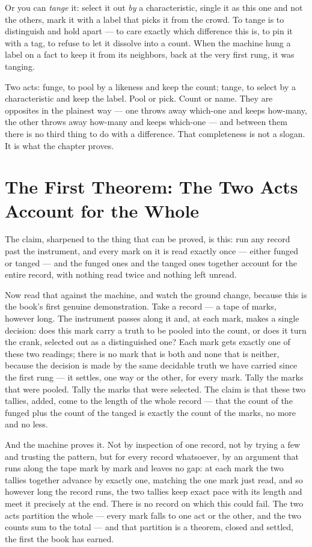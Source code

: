 Or you can \emph{tange} it: select it out \emph{by} a characteristic, single it as this one and not the others,
mark it with a label that picks it from the crowd. To tange is to distinguish and hold apart --- to care exactly
which difference this is, to pin it with a tag, to refuse to let it dissolve into a count. When the machine hung a
label on a fact to keep it from its neighbors, back at the very first rung, it was tanging.

Two acts: funge, to pool by a likeness and keep the count; tange, to select by a characteristic and keep the
label. Pool or pick. Count or name. They are opposites in the plainest way --- one throws away which-one and
keeps how-many, the other throws away how-many and keeps which-one --- and between them there is no third thing
to do with a difference. That completeness is not a slogan. It is what the chapter proves.

\section{The First Theorem: The Two Acts Account for the Whole}

The claim, sharpened to the thing that can be proved, is this: run any record past the instrument, and every mark
on it is read exactly once --- either funged or tanged --- and the funged ones and the tanged ones together
account for the entire record, with nothing read twice and nothing left unread.

Now read that against the machine, and watch the ground change, because this is the book's first genuine
demonstration. Take a record --- a tape of marks, however long. The instrument passes along it and, at each mark,
makes a single decision: does this mark carry a truth to be pooled into the count, or does it turn the crank,
selected out as a distinguished one? Each mark gets exactly one of these two readings; there is no mark that is
both and none that is neither, because the decision is made by the same decidable truth we have carried since the
first rung --- it settles, one way or the other, for every mark. Tally the marks that were pooled. Tally the
marks that were selected. The claim is that these two tallies, added, come to the length of the whole record ---
that the count of the funged plus the count of the tanged is exactly the count of the marks, no more and no less.

And the machine proves it. Not by inspection of one record, not by trying a few and trusting the pattern, but for
every record whatsoever, by an argument that runs along the tape mark by mark and leaves no gap: at each mark the
two tallies together advance by exactly one, matching the one mark just read, and so however long the record
runs, the two tallies keep exact pace with its length and meet it precisely at the end. There is no record on
which this could fail. The two acts partition the whole --- every mark falls to one act or the other, and the two
counts sum to the total --- and that partition is a theorem, closed and settled, the first the book has earned.

